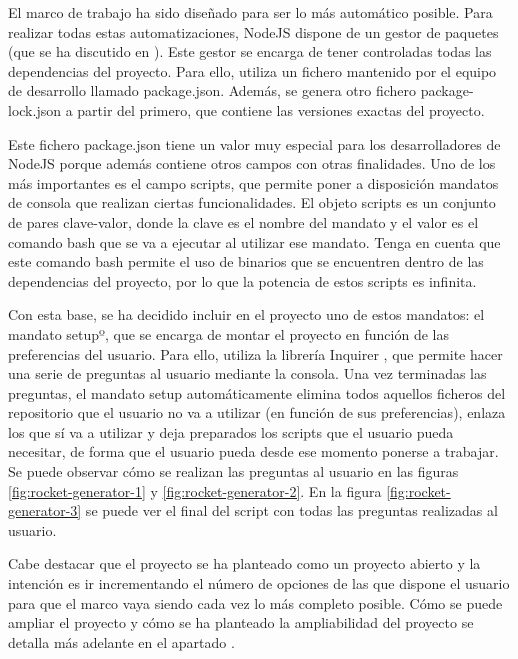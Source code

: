 El marco de trabajo ha sido diseñado para ser lo más automático posible. Para realizar todas estas automatizaciones, NodeJS dispone de un gestor de paquetes (que se ha discutido en ). Este gestor se encarga de tener controladas todas las dependencias del proyecto. Para ello, utiliza un fichero mantenido por el equipo de desarrollo llamado package.json. Además, se genera otro fichero package-lock.json a partir del primero, que contiene las versiones exactas del proyecto.

Este fichero package.json tiene un valor muy especial para los desarrolladores de NodeJS porque además contiene otros campos con otras finalidades. Uno de los más importantes es el campo scripts, que permite poner a disposición mandatos de consola que realizan ciertas funcionalidades. El objeto scripts es un conjunto de pares clave-valor, donde la clave es el nombre del mandato y el valor es el comando bash que se va a ejecutar al utilizar ese mandato. Tenga en cuenta que este comando bash permite el uso de binarios que se encuentren dentro de las dependencias del proyecto, por lo que la potencia de estos scripts es infinita.

Con esta base, se ha decidido incluir en el proyecto uno de estos mandatos: el mandato setupº, que se encarga de montar el proyecto en función de las preferencias del usuario. Para ello, utiliza la librería Inquirer \cite{NPMLINQ}, que permite hacer una serie de preguntas al usuario mediante la consola. Una vez terminadas las preguntas, el mandato setup automáticamente elimina todos aquellos ficheros del repositorio que el usuario no va a utilizar (en función de sus preferencias), enlaza los que sí va a utilizar y deja preparados los scripts que el usuario pueda necesitar, de forma que el usuario pueda desde ese momento ponerse a trabajar. Se puede observar cómo se realizan las preguntas al usuario en las figuras \cref{fig:rocket-generator-1} y \cref{fig:rocket-generator-2}. En la figura \cref{fig:rocket-generator-3} se puede ver el final del script con todas las preguntas realizadas al usuario.

Cabe destacar que el proyecto se ha planteado como un proyecto abierto y la intención es ir incrementando el número de opciones de las que dispone el usuario para que el marco vaya siendo cada vez lo más completo posible. Cómo se puede ampliar el proyecto y cómo se ha planteado la ampliabilidad del proyecto se detalla más adelante en el apartado .

